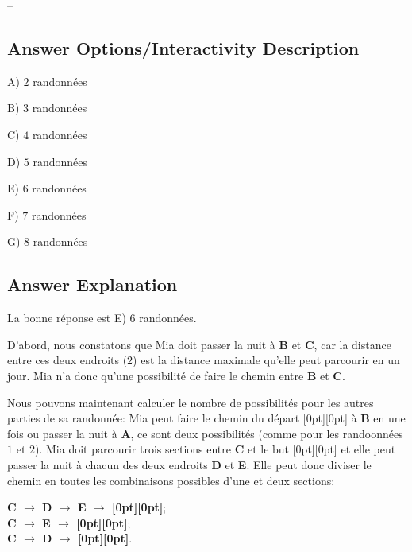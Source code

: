 \documentclass[a4paper,11pt]{report}
\makeatletter
\renewenvironment{adjustwidth}[2]{%
    \begin{list}{}{%
    \partopsep\z@%
    \topsep\z@%
    \listparindent\parindent%
    \parsep\parskip%
    \@ifmtarg{#1}{\setlength{\leftmargin}{\z@}}%
                 {\setlength{\leftmargin}{#1}}%
    \@ifmtarg{#2}{\setlength{\rightmargin}{\z@}}%
                 {\setlength{\rightmargin}{#2}}%
    }
    \item[]}{\end{list}}
\newcommand{\taskGraphicsFolder}{..}
\makeatother
\begin{document}
–

\begingroup
\renewcommand{\arraystretch}{1.5}
\subsection*{Answer Options/Interactivity Description}

A) $2$ randonnées

B) $3$ randonnées

C) $4$ randonnées

D) $5$ randonnées

E) $6$ randonnées

F) $7$ randonnées

G) $8$ randonnées

\endgroup

\subsection*{Answer Explanation}

La bonne réponse est E) $6$ randonnées.

{\centering%
\par}

D’abord, nous constatons que Mia doit passer la nuit à \textbf{B} et \textbf{C}, car la distance entre ces deux endroits ($2$) est la distance maximale qu’elle peut parcourir en un jour. Mia n’a donc qu’une possibilité de faire le chemin entre \textbf{B} et \textbf{C}.

Nous pouvons maintenant calculer le nombre de possibilités pour les autres parties de sa randonnée: Mia peut faire le chemin du départ \raisebox{-0.5ex}[0pt][0pt]{} à \textbf{B} en une fois ou passer la nuit à \textbf{A}, ce sont deux possibilités (comme pour les randoonnées $1$ et $2$). Mia doit parcourir trois sections entre \textbf{C} et le but \raisebox{-0.5ex}[0pt][0pt]{} et elle peut passer la nuit à chacun des deux endroits \textbf{D} et \textbf{E}. Elle peut donc diviser le chemin en toutes les combinaisons possibles d’une et deux sections:

\begin{adjustwidth}{1.5em}{0em}
\textbf{C \ensuremath{\rightarrow} D \ensuremath{\rightarrow} E \ensuremath{\rightarrow} \raisebox{-0.5ex}[0pt][0pt]{}};  \\
\textbf{C \ensuremath{\rightarrow} E \ensuremath{\rightarrow} \raisebox{-0.5ex}[0pt][0pt]{}};      \\
\textbf{C \ensuremath{\rightarrow} D \ensuremath{\rightarrow} \raisebox{-0.5ex}[0pt][0pt]{}}.
\end{adjustwidth}
\end{document}
